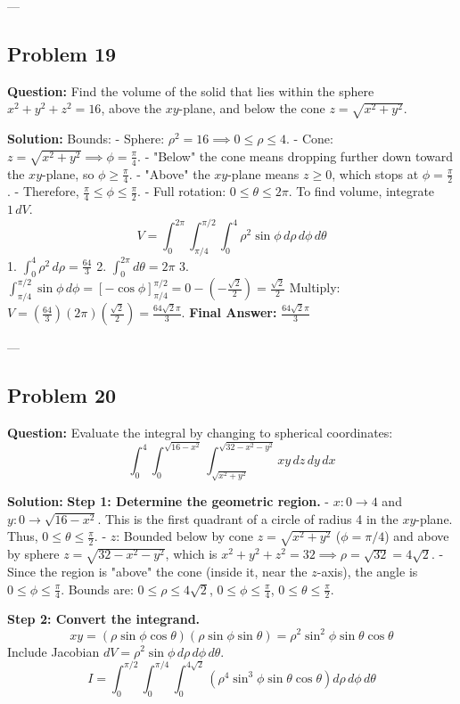 \documentclass[12pt]{article}
\begin{document}
---

\subsection*{Problem 19}
\textbf{Question:} Find the volume of the solid that lies within the sphere $x^2+y^2+z^2=16$, above the $xy$-plane, and below the cone $z=\sqrt{x^2+y^2}$.

\textbf{Solution:}
Bounds:
- Sphere: $\rho^2 = 16 \implies 0 \le \rho \le 4$.
- Cone: $z = \sqrt{x^2+y^2} \implies \phi = \frac{\pi}{4}$.
- "Below" the cone means dropping further down toward the $xy$-plane, so $\phi \ge \frac{\pi}{4}$.
- "Above" the $xy$-plane means $z \ge 0$, which stops at $\phi = \frac{\pi}{2}$.
- Therefore, $\frac{\pi}{4} \le \phi \le \frac{\pi}{2}$.
- Full rotation: $0 \le \theta \le 2\pi$.
To find volume, integrate $1 \, dV$.
\[ V = \int_0^{2\pi} \int_{\pi/4}^{\pi/2} \int_0^4 \rho^2 \sin\phi \, d\rho \, d\phi \, d\theta \]
1. $\int_0^4 \rho^2 \, d\rho = \frac{64}{3}$
2. $\int_0^{2\pi} d\theta = 2\pi$
3. $\int_{\pi/4}^{\pi/2} \sin\phi \, d\phi = [-\cos\phi]_{\pi/4}^{\pi/2} = 0 - \left(-\frac{\sqrt{2}}{2}\right) = \frac{\sqrt{2}}{2}$
Multiply: $V = \left( \frac{64}{3} \right)(2\pi)\left( \frac{\sqrt{2}}{2} \right) = \frac{64\sqrt{2}\pi}{3}$.
\textbf{Final Answer:} $\frac{64\sqrt{2}\pi}{3}$

---

\subsection*{Problem 20}
\textbf{Question:} Evaluate the integral by changing to spherical coordinates:
\[ \int_0^4 \int_0^{\sqrt{16-x^2}} \int_{\sqrt{x^2+y^2}}^{\sqrt{32-x^2-y^2}} xy \, dz \, dy \, dx \]

\textbf{Solution:}
\textbf{Step 1: Determine the geometric region.}
- $x: 0 \to 4$ and $y: 0 \to \sqrt{16-x^2}$. This is the first quadrant of a circle of radius 4 in the $xy$-plane. Thus, $0 \le \theta \le \frac{\pi}{2}$.
- $z$: Bounded below by cone $z = \sqrt{x^2+y^2}$ ($\phi = \pi/4$) and above by sphere $z = \sqrt{32-x^2-y^2}$, which is $x^2+y^2+z^2=32 \implies \rho = \sqrt{32} = 4\sqrt{2}$.
- Since the region is "above" the cone (inside it, near the $z$-axis), the angle is $0 \le \phi \le \frac{\pi}{4}$.
Bounds are: $0 \le \rho \le 4\sqrt{2}$, $0 \le \phi \le \frac{\pi}{4}$, $0 \le \theta \le \frac{\pi}{2}$.

\textbf{Step 2: Convert the integrand.}
\[ xy = (\rho \sin\phi \cos\theta)(\rho \sin\phi \sin\theta) = \rho^2 \sin^2\phi \sin\theta \cos\theta \]
Include Jacobian $dV = \rho^2 \sin\phi \, d\rho \, d\phi \, d\theta$.
\[ I = \int_0^{\pi/2} \int_0^{\pi/4} \int_0^{4\sqrt{2}} \left(\rho^4 \sin^3\phi \sin\theta \cos\theta\right) d\rho \, d\phi \, d\theta \]
\end{document}
